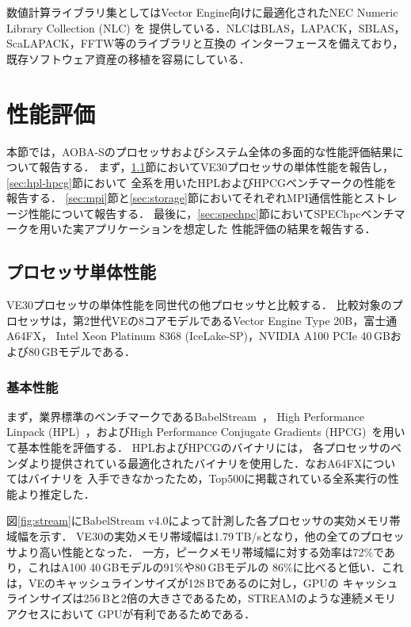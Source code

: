 ﻿\documentclass[submit,techrep,noauthor]{ipsj}
\begin{document}
数値計算ライブラリ集としてはVector Engine向けに最適化されたNEC Numeric Library Collection (NLC) を
提供している．NLCはBLAS，LAPACK，SBLAS，ScaLAPACK，FFTW等のライブラリと互換の
インターフェースを備えており，既存ソフトウェア資産の移植を容易にしている．

\section{性能評価}

本節では，AOBA-Sのプロセッサおよびシステム全体の多面的な性能評価結果について報告する．
まず，\ref{sec:proc}節においてVE30プロセッサの単体性能を報告し，\ref{sec:hpl-hpcg}節において
全系を用いたHPLおよびHPCGベンチマークの性能を報告する．
\ref{sec:mpi}節と\ref{sec:storage}節においてそれぞれMPI通信性能とストレージ性能について報告する．
最後に，\ref{sec:spechpc}節においてSPEChpcベンチマークを用いた実アプリケーションを想定した
性能評価の結果を報告する．

\subsection{プロセッサ単体性能}\label{sec:proc}

VE30プロセッサの単体性能を同世代の他プロセッサと比較する．
比較対象のプロセッサは，第2世代VEの8コアモデルであるVector Engine Type 20B，富士通A64FX，
Intel Xeon Platinum 8368 (IceLake-SP)，NVIDIA A100 PCIe 40\,GBおよび80\,GBモデルである．

\subsubsection{基本性能}

まず，業界標準のベンチマークであるBabelStream~\cite{Deakin2018}，
High Performance Linpack (HPL)~\cite{Dongarra2003}，およびHigh Performance Conjugate
Gradients (HPCG)~\cite{Dongarra2016}を用いて基本性能を評価する．
HPLおよびHPCGのバイナリには，
各プロセッサのベンダより提供されている最適化されたバイナリを使用した．なおA64FXについてはバイナリを
入手できなかったため，Top500に掲載されている全系実行の性能より推定した．

図\ref{fig:stream}にBabelStream v4.0によって計測した各プロセッサの実効メモリ帯域幅を示す．
VE30の実効メモリ帯域幅は1.79\,TB/sとなり，他の全てのプロセッサより高い性能となった．
一方，ピークメモリ帯域幅に対する効率は72\%であり，これはA100 40\,GBモデルの91\%や80\,GBモデルの
86\%に比べると低い．これは，VEのキャッシュラインサイズが128\,Bであるのに対し，GPUの
キャッシュラインサイズは256\,Bと2倍の大きさであるため，STREAMのような連続メモリアクセスにおいて
GPUが有利であるためである．
\end{document}
